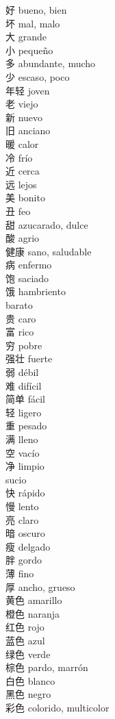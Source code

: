 好 \quad bueno, bien\\
坏 \quad mal, malo\\
大 \quad grande\\
小 \quad pequeño\\
多 \quad abundante, mucho\\
少 \quad escaso, poco\\
年轻 \quad joven\\
老 \quad viejo\\
新 \quad nuevo\\
旧 \quad anciano\\
暖 \quad calor\\
冷 \quad frío\\
近 \quad cerca\\
远 \quad lejos\\
美 \quad bonito\\
丑 \quad feo\\
甜 \quad azucarado, dulce\\
酸 \quad agrio\\
健康 \quad sano, saludable\\
病 \quad enfermo\\
饱 \quad saciado\\
饿 \quad hambriento\\
 \quad barato\\
贵 \quad caro\\
富 \quad rico\\
穷 \quad pobre\\
强壮 \quad fuerte\\
弱 \quad débil\\
难 \quad difícil\\
简单 \quad fácil\\
轻 \quad ligero\\
重 \quad pesado\\
满 \quad lleno\\
空 \quad vacío\\
净 \quad limpio\\
 \quad sucio\\
快 \quad rápido\\
慢 \quad lento\\
亮 \quad claro\\
暗 \quad oscuro\\
瘦 \quad delgado\\
胖 \quad gordo\\
薄 \quad fino\\
厚 \quad ancho, grueso\\
黄色 \quad amarillo\\
橙色 \quad naranja\\
红色 \quad rojo\\
蓝色 \quad azul\\
绿色 \quad verde\\
棕色 \quad pardo, marrón\\
白色 \quad blanco\\
黑色 \quad negro\\
彩色 \quad colorido, multicolor\\
